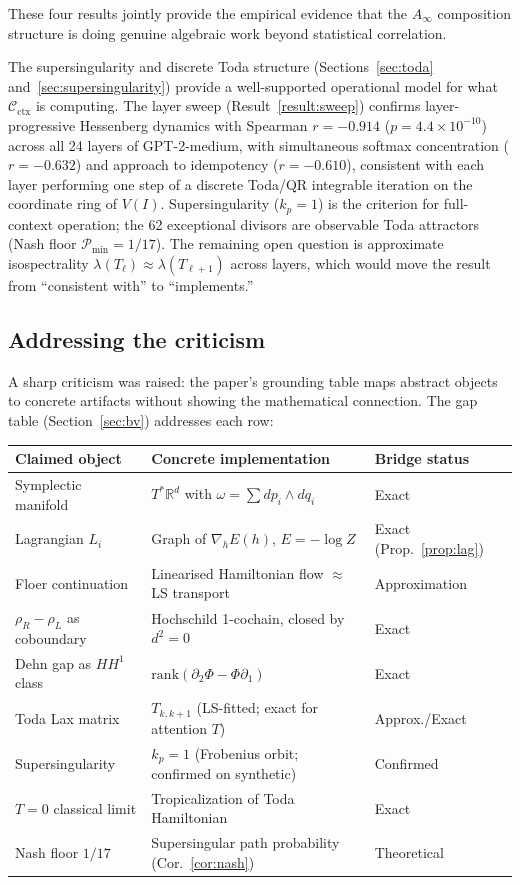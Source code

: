 \documentclass[11pt]{amsart}
\theoremstyle{definition}
\newcommand{\Cctx}{\mathcal{C}_{\!\mathrm{ctx}}}
\newcommand{\rhoR}{\rho_R}
\newcommand{\rhoL}{\rho_L}
\begin{document}
These four results jointly provide the empirical evidence that the $A_\infty$ composition
structure is doing genuine algebraic work beyond statistical correlation.

The supersingularity and discrete Toda structure (Sections~\ref{sec:toda}
and~\ref{sec:supersingularity}) provide a well-supported operational model
for what $\Cctx$ is computing.
The layer sweep (Result~\ref{result:sweep}) confirms layer-progressive
Hessenberg dynamics with Spearman $r = -0.914$
($p = 4.4\times10^{-10}$) across all 24 layers of GPT-2-medium,
with simultaneous softmax concentration ($r = -0.632$) and approach
to idempotency ($r = -0.610$), consistent with each layer performing
one step of a discrete Toda/QR integrable iteration on the coordinate
ring of $V(I)$.
Supersingularity ($k_p=1$) is the criterion for full-context operation;
the 62 exceptional divisors are observable Toda attractors
(Nash floor $\mathcal{P}_{\min} = 1/17$).
The remaining open question is approximate isospectrality
$\lambda(T_\ell) \approx \lambda(T_{\ell+1})$ across layers,
which would move the result from ``consistent with'' to ``implements.''

\subsection{Addressing the criticism}

A sharp criticism was raised: the paper's grounding table maps abstract objects to
concrete artifacts without showing the mathematical connection.
The gap table (Section~\ref{sec:bv}) addresses each row:

\begin{center}
\renewcommand{\arraystretch}{1.2}
\begin{tabular}{@{}lll@{}}
\toprule
Claimed object & Concrete implementation & Bridge status \\
\midrule
Symplectic manifold & $T^*\mathbb{R}^d$ with $\omega = \sum dp_i\wedge dq_i$ & Exact \\
Lagrangian $L_i$ & Graph of $\nabla_h E(h)$, $E=-\log Z$ & Exact (Prop.~\ref{prop:lag}) \\
Floer continuation & Linearised Hamiltonian flow $\approx$ LS transport & Approximation \\
$\rhoR-\rhoL$ as coboundary & Hochschild 1-cochain, closed by $d^2=0$ & Exact \\
Dehn gap as $HH^1$ class & $\mathrm{rank}(\partial_2\Phi-\Phi\partial_1)$ & Exact \\
Toda Lax matrix & $T_{k,k+1}$ (LS-fitted; exact for attention $T$) & Approx./Exact \\
Supersingularity & $k_p = 1$ (Frobenius orbit; confirmed on synthetic) & Confirmed \\
$T=0$ classical limit & Tropicalization of Toda Hamiltonian & Exact \\
Nash floor $1/17$ & Supersingular path probability (Cor.~\ref{cor:nash}) & Theoretical \\
\bottomrule
\end{tabular}
\end{center}
\end{document}
